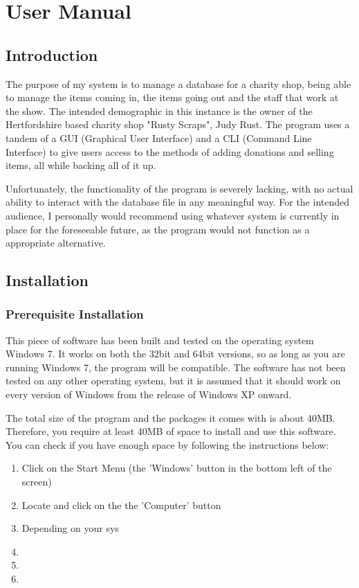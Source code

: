 \chapter{User Manual}

\section{Introduction}
The purpose of my system is to manage a database for a charity shop, being able to manage the items coming in, the items going out and the staff that work at the show. The intended demographic in this instance is the owner of the Hertfordshire based charity shop "Rusty Scraps", Judy Rust. The program uses a tandem of a GUI (Graphical User Interface) and a CLI (Command Line Interface) to give users access to the methods of adding donations and selling items, all while backing all of it up.

Unfortunately, the functionality of the program is severely lacking, with no actual ability to interact with the database file in any meaningful way. For the intended audience, I personally would recommend using whatever system is currently in place for the foreseeable future, as the program would not function as a appropriate alternative.

\section{Installation}

\subsection{Prerequisite Installation}

This piece of software has been built and tested on the operating system Windows 7. It works on both the 32bit and 64bit versions, so as long as you are running Windows 7, the program will be compatible. The software has not been tested on any other operating system, but it is assumed that it should work on every version of Windows from the release of Windows XP onward.

The total size of the program and the packages it comes with is about 40MB. Therefore, you require at least 40MB of space to install and use this software. You can check if you have enough space by following the instructions below:
\begin{enumerate}
    \item Click on the Start Menu (the 'Windows' button in the bottom left of the screen)
    \item Locate and click on the the 'Computer' button
    \item Depending on your sys
    \item 
    \item 
    \item 

\end{enumerate}

